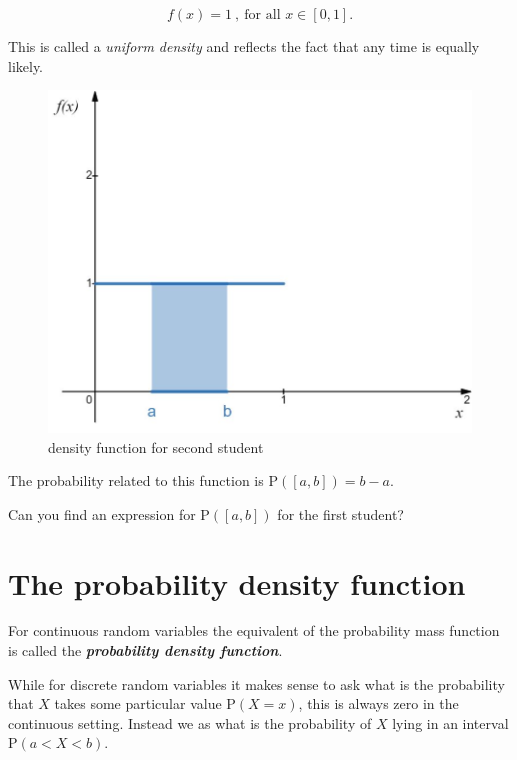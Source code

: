 \documentclass[
]{book}
\theoremstyle{definition}
\theoremstyle{definition}
\theoremstyle{definition}
\theoremstyle{definition}
\theoremstyle{remark}
\begin{document}
\[f(x) = 1\ ,\ \text{for all } x\in[0,1].\]

This is called a \emph{uniform density} and reflects the fact that any time is equally likely.

\begin{figure}

{\centering \includegraphics[width=0.75\linewidth]{./figures/student2} 

}

\caption{density function for second student}\label{fig:student2}
\end{figure}

The probability related to this function is \(\text{P}([a,b]) = b-a\).

Can you find an expression for \(\text{P}([a,b])\) for the first student?

\hypertarget{the-probability-density-function}{%
\section{The probability density function}\label{the-probability-density-function}}

For continuous random variables the equivalent of the probability mass function is called the \textbf{\emph{probability density function}}.

While for discrete random variables it makes sense to ask what is the probability that \(X\) takes some particular value \(\text{P}(X=x)\), this is always zero in the continuous setting. Instead we as what is the probability of \(X\) lying in an interval \(\text{P}(a<X<b)\).
\end{document}
